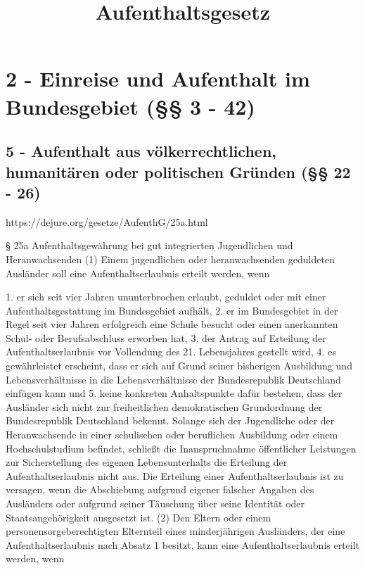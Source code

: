 \title{Aufenthaltsgesetz}
\chapter{2 - Einreise und Aufenthalt im Bundesgebiet (§§ 3 - 42)}
\section{ 5 - Aufenthalt aus völkerrechtlichen, humanitären oder politischen Gründen (§§ 22 - 26)}

https://dejure.org/gesetze/AufenthG/25a.html

§ 25a
Aufenthaltsgewährung bei gut integrierten Jugendlichen und Heranwachsenden
(1) Einem jugendlichen oder heranwachsenden geduldeten Ausländer soll eine Aufenthaltserlaubnis erteilt werden, wenn

1.	er sich seit vier Jahren ununterbrochen erlaubt, geduldet oder mit einer Aufenthaltsgestattung im Bundesgebiet aufhält,
2.	er im Bundesgebiet in der Regel seit vier Jahren erfolgreich eine Schule besucht oder einen anerkannten Schul- oder Berufsabschluss erworben hat,
3.	der Antrag auf Erteilung der Aufenthaltserlaubnis vor Vollendung des 21. Lebensjahres gestellt wird,
4.	es gewährleistet erscheint, dass er sich auf Grund seiner bisherigen Ausbildung und Lebensverhältnisse in die Lebensverhältnisse der Bundesrepublik Deutschland einfügen kann und
5.	keine konkreten Anhaltspunkte dafür bestehen, dass der Ausländer sich nicht zur freiheitlichen demokratischen Grundordnung der Bundesrepublik Deutschland bekennt.
Solange sich der Jugendliche oder der Heranwachsende in einer schulischen oder beruflichen Ausbildung oder einem Hochschulstudium befindet, schließt die Inanspruchnahme öffentlicher Leistungen zur Sicherstellung des eigenen Lebensunterhalts die Erteilung der Aufenthaltserlaubnis nicht aus. Die Erteilung einer Aufenthaltserlaubnis ist zu versagen, wenn die Abschiebung aufgrund eigener falscher Angaben des Ausländers oder aufgrund seiner Täuschung über seine Identität oder Staatsangehörigkeit ausgesetzt ist.
(2) Den Eltern oder einem personensorgeberechtigten Elternteil eines minderjährigen Ausländers, der eine Aufenthaltserlaubnis nach Absatz 1 besitzt, kann eine Aufenthaltserlaubnis erteilt werden, wenn

